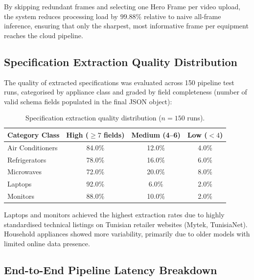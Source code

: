 By skipping redundant frames and selecting one Hero Frame per video upload, the system reduces processing load by $99.88\%$ relative to naive all-frame inference, ensuring that only the sharpest, most informative frame per equipment reaches the cloud pipeline.

\subsection{Specification Extraction Quality Distribution}

The quality of extracted specifications was evaluated across 150 pipeline test runs, categorised by appliance class and graded by field completeness (number of valid schema fields populated in the final JSON object):

\begin{table}[htbp]
\centering
\caption{Specification extraction quality distribution ($n = 150$ runs).}
\label{tab:ch4-spec-quality}
\begin{tabular}{lccc}
\toprule
\textbf{Category Class} & \textbf{High ($\geq 7$ fields)} & \textbf{Medium (4--6)} & \textbf{Low ($<4$)} \\
\midrule
Air Conditioners & 84.0\% & 12.0\% & 4.0\% \\
Refrigerators    & 78.0\% & 16.0\% & 6.0\% \\
Microwaves       & 72.0\% & 20.0\% & 8.0\% \\
Laptops          & 92.0\% &  6.0\% & 2.0\% \\
Monitors         & 88.0\% & 10.0\% & 2.0\% \\
\bottomrule
\end{tabular}
\end{table}

Laptops and monitors achieved the highest extraction rates due to highly standardised technical listings on Tunisian retailer websites (Mytek, TunisiaNet). Household appliances showed more variability, primarily due to older models with limited online data presence.

\subsection{End-to-End Pipeline Latency Breakdown}

